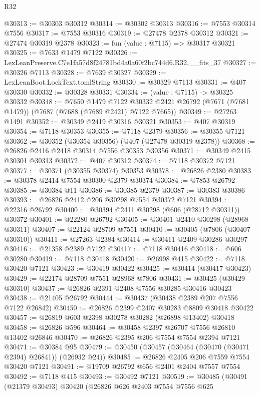 \begin{lexlean}{R32}
\begin{coremodule}
@30313 := @30303 @30312
@30314 := @30302 @30313
@30316 := @7553 @30314 @7556
@30317 := @7553 @30316
@30319 := @27478 @2378 @30312
@30321 := @27474 @30319 @2378
@30323 := fun (value : @7115) => @30317 @30321
@30325 := @7633 @1479 @7122
@30326 := LexLeanPreserve.C7e1fa57d8f24781bd4a0a60f2bc744d6.R32.__fits_37
@30327 := @30326 @7113
@30328 := @7639 @30327
@30329 := LexLeanBoot.LockText.tomlString
@30330 := @30329 @7113
@30331 := @407 @30330
@30332 := @30328 @30331
@30334 := (value : @7115) -> @30325 @30332
@30348 := @7650
    @1479
    @7122
    @30332
    @2421
    @26792
    (@7671 (@7681 @1479))
    (@7687 (@7688 (@7689 @2421) @7122 @7665))
@30349 := @27263 @1491
@30352 := @30349 @2419 @30316 @30321
@30353 := @407 @30319
@30354 := @7118 @30353
@30355 := @7118 @2379
@30356 := @30355 @7121
@30362 := @30352 (@30354 @30356) (@407 (@27478 @30319 @2378))
@30368 := @26826 @2416 @2418 @30314 @7556 @30353 @30356
@30371 := @30349 @2415 @30301 @30313
@30372 := @407 @30312
@30374 := @7118 @30372 @7121
@30377 := @30371 (@30355 @30374) @30353
@30378 := @26826 @2380
@30383 := @30378 @2414 @7554 @30300 @2379 @30374
@30384 := @7853 @26792
@30385 := @30384 @11
@30386 := @30385 @2379
@30387 := @30383 @30386
@30393 := @26826 @2412 @206 @30298 @7554 @30372 @7121
@30394 := @22316 @26792
@30400 := @30394 @2411 @30298 (@606 (@28712 @30311)) @30372
@30401 := @22280 @26792
@30405 := @30401 @2410 @30298 (@28968 @30311)
@30407 := @22124 @28709 @7551
@30410 := @30405 (@7806 (@30407 @30310))
@30411 := @27263 @2384
@30414 := @30411 @2409 @30286 @30297
@30416 := @21358 @2389 @7122
@30417 := @7118 @30416
@30418 := @606 @30280
@30419 := @7118 @30418
@30420 := @26998 @415
@30422 := @7118 @30420 @7121
@30423 := @30419 @30422
@30425 := @30414 (@30417 @30423)
@30429 := @22174 @28709 @7551 @28968 @7806
@30431 := @30425 (@30429 @30310)
@30437 := @26826 @2391 @2408 @7556 @30285 @30416 @30423
@30438 := @21405 @26792
@30444 := @30437 (@30438 @2389 @207 @7556 @7122 @26842)
@30450 := @26826 @2399 @2407 @30283 @8809 @30418 @30422
@30457 := @26819 @603 @2398 @30278 @30282 (@26898 @13402) @30418
@30458 := @26826 @596
@30464 := @30458 @2397 @26707 @7556 @26810 @13402 @26846
@30470 := @26826 @2395 @206 @7554 @7554 @2394 @7121
@30471 := @30384 @95
@30479 := @30450 (@30457 (@30464 (@30470 (@30471 @2394) @26841)) (@26932 @24))
@30485 := @26826 @2405 @206 @7559 @7554 @30420 @7121
@30491 := @19709 @26792 @656 @2401 @2404 @7557 @7554
@30492 := @7118 @415
@30493 := @30492 @7121
@30519 := @30485
    (@30491
      (@21379 @30493)
      @30420
      (@26826
        @626
        @2403
        @7554
        @7556
        @625

\end{coremodule}
\end{lexlean}
